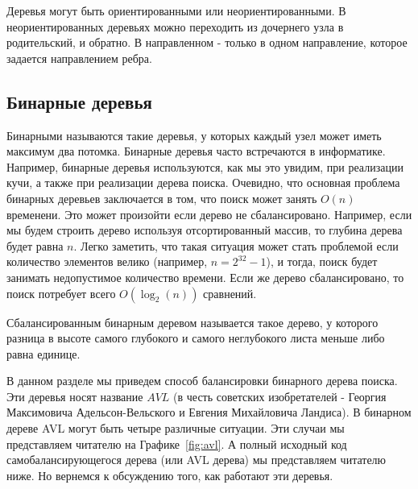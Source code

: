 Деревья могут быть ориентированными или неориентированными. В неориентированных
деревьях можно переходить из дочернего узла в родительский, и обратно. В направленном - 
только в одном направление, которое задается направлением ребра.

\subsection{Бинарные деревья}

Бинарными называются такие деревья, у которых каждый узел может иметь 
максимум два потомка. Бинарные деревья часто встречаются в информатике.
Например, бинарные деревья используются, как мы это увидим, при реализации
кучи, а также при реализации дерева поиска. Очевидно, что основная проблема
бинарных деревьев заключается в том, что поиск может занять $O(n)$ временени.
Это может произойти если дерево не сбалансировано. Например, если мы будем 
строить дерево используя отсортированный массив, то глубина дерева будет 
равна $n$. Легко заметить, что такая ситуация может стать проблемой если
количество элементов велико (например, $n=2^{32}-1$), и тогда, поиск будет 
занимать недопустимое количество времени. Если же дерево сбалансировано,
то поиск потребует всего $O(\log_2(n))$ сравнений.


\begin{definition}
Сбалансированным бинарным деревом называется такое дерево, у которого
разница в высоте самого глубокого и самого неглубокого листа меньше либо равна 
единице.
\end{definition}

В данном разделе мы приведем способ балансировки бинарного дерева поиска. Эти деревья
носят название $AVL$ (в честь советских изобретателей - Георгия Максимовича 
Адельсон-Вельского и Евгения Михайловича Ландиса). В бинарном дереве AVL могут быть 
четыре различные ситуации. Эти случаи мы представляем читателю на Графике~\ref{fig:avl}.
А полный исходный код самобалансирующегося дерева (или AVL дерева) мы представляем
читателю ниже. Но вернемся к обсуждению того, как работают эти деревья. 

